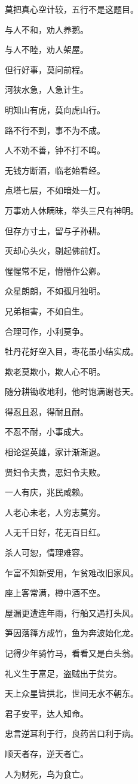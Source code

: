 \documentclass[12pt,oneside]{book}
\begin{document}
莫把真心空计较，五行不是这题目。

与人不和，劝人养鹅。

与人不睦，劝人架屋。

但行好事，莫问前程。

河狭水急，人急计生。

明知山有虎，莫向虎山行。

路不行不到，事不为不成。

人不劝不善，钟不打不鸣。

无钱方断酒，临老始看经。

点塔七层，不如暗处一灯。

万事劝人休瞒昧，举头三尺有神明。

但存方寸土，留与子孙耕。

灭却心头火，剔起佛前灯。

惺惺常不足，懵懵作公卿。

众星朗朗，不如孤月独明。

兄弟相害，不如自生。

合理可作，小利莫争。

牡丹花好空入目，枣花虽小结实成。

欺老莫欺小，欺人心不明。

随分耕锄收地利，他时饱满谢苍天。

得忍且忍，得耐且耐。

不忍不耐，小事成大。

相论逞英雄，家计渐渐退。

贤妇令夫贵，恶妇令夫败。

一人有庆，兆民咸赖。

人老心未老，人穷志莫穷。

人无千日好，花无百日红。

杀人可恕，情理难容。

乍富不知新受用，乍贫难改旧家风。

座上客常满，樽中酒不空。

屋漏更遭连年雨，行船又遇打头风。

笋因落箨方成竹，鱼为奔波始化龙。

记得少年骑竹马，看看又是白头翁。

礼义生于富足，盗贼出于贫穷。

天上众星皆拱北，世间无水不朝东。

君子安平，达人知命。

忠言逆耳利于行，良药苦口利于病。

顺天者存，逆天者亡。

人为财死，鸟为食亡。
\end{document}
